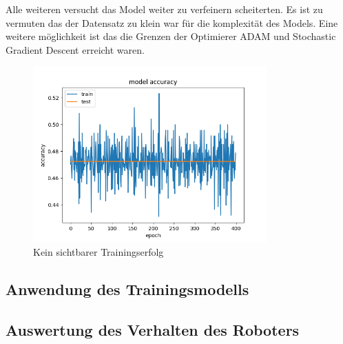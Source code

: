 \documentclass[conference]{IEEEtran}
\begin{document}
Alle weiteren versucht das Model weiter zu verfeinern scheiterten. Es ist zu vermuten das der Datensatz zu klein war für die komplexität des Models. Eine weitere möglichkeit ist das die Grenzen der Optimierer ADAM und Stochastic Gradient Descent erreicht waren. 
\begin{figure}[!h]
	\centering
	\includegraphics[width=9cm]{img/480x360:400@32_accuracy.png}
	\caption{Kein sichtbarer Trainingserfolg}
	\label{erfolgloos }
\end{figure}


\subsection{Anwendung des Trainingsmodells} %
\subsection {Auswertung des Verhalten des Roboters}	%
\end{document}

